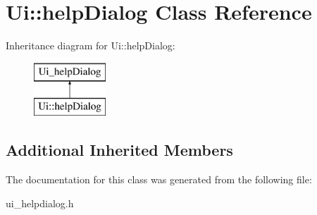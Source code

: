\hypertarget{classUi_1_1helpDialog}{\section{Ui\-:\-:help\-Dialog Class Reference}
\label{classUi_1_1helpDialog}
}
Inheritance diagram for Ui\-:\-:help\-Dialog\-:\begin{figure}[H]
\begin{center}
\leavevmode
\includegraphics[height=2.000000cm]{classUi_1_1helpDialog}
\end{center}
\end{figure}
\subsection*{Additional Inherited Members}


The documentation for this class was generated from the following file\-:\begin{DoxyCompactItemize}
\item 
ui\-\_\-helpdialog.\-h\end{DoxyCompactItemize}
